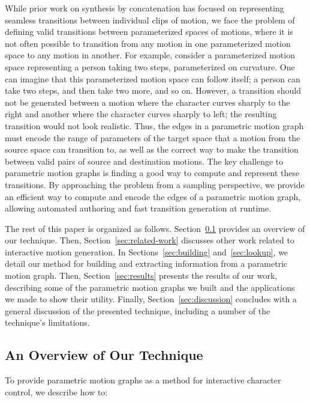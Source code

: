 \documentclass[10pt,twocolumn]{article}
\begin{document}
While prior work on synthesis by concatenation has focused on representing seamless transitions between individual clips of motion, we face the problem of defining valid transitions between parameterized spaces of motions, where it is not often possible to transition from any motion in one parameterized motion space to any motion in another. For example, consider a parameterized motion space representing a person taking two steps, parameterized on curvature. One can imagine that this parameterized motion space can follow itself; a person can take two steps, and then take two more, and so on. However, a transition should not be generated between a motion where the character curves sharply to the right and another where the character curves sharply to left; the resulting transition would not look realistic. Thus, the edges in a parametric motion graph must encode the range of parameters of the target space that a motion from the source space can transition to, as well as the correct way to make the transition between valid pairs of source and destination motions. The key challenge to parametric motion graphs is finding a good way to compute and represent these transitions. By approaching the problem from a sampling perspective, we provide an efficient way to compute and encode the edges of a parametric motion graph, allowing automated authoring and fast transition generation at runtime.

The rest of this paper is organized as follows. Section~\ref{sec:overview} provides an overview of our technique. Then, Section~\ref{sec:related-work} discusses other work related to interactive motion generation. In Sections~\ref{sec:building} and~\ref{sec:lookup}, we detail our method for building and extracting information from a parametric motion graph. Then, Section~\ref{sec:results} presents the results of our work, describing some of the parametric motion graphs we built and the applications we made to show their utility. Finally, Section~\ref{sec:discussion} concludes with a general discussion of the presented technique, including a number of the technique's limitations.

\subsection{An Overview of Our Technique}
\label{sec:overview}

To provide parametric motion graphs as a method for interactive character control, we describe how to:
\end{document}
